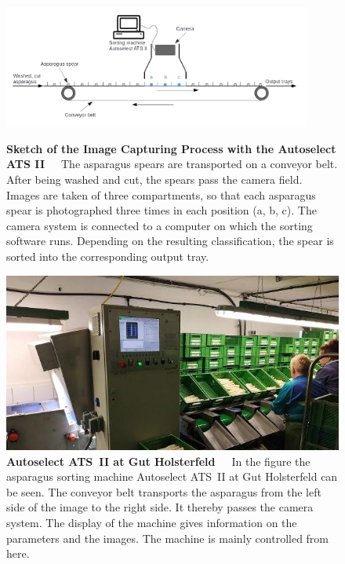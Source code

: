 \begin{figure}[!htb]
	\centering
	\includegraphics[width=0.9\textwidth]{Figures/chapter02/asparagusconveyerbelt_new.png}
	\decoRule
	\caption[Sketch of the Image Capturing Process with the Autoselect ATS II]{\textbf{Sketch of the Image Capturing Process with the Autoselect ATS II}~~~The asparagus spears are transported on a conveyor belt. After being washed and cut, the spears pass the camera field. Images are taken of three compartments, so that each asparagus spear is photographed three times in each position (a, b, c). The camera system is connected to a computer on which the sorting software runs. Depending on the resulting classification, the spear is sorted into the corresponding output tray.}
	\label{fig:SortingMachineSketch}
	\vspace{15pt}
	\centering
	\includegraphics[scale=0.6]{Figures/chapter02/sortingmachine_front.png}
	\decoRule
	\caption[The Autoselect ATS II at Gut Holsterfeld]{\textbf{Autoselect ATS~II at Gut Holsterfeld}~~~In the figure the asparagus sorting machine Autoselect ATS~II at Gut Holsterfeld can be seen. The conveyor belt transports the asparagus from the left side of the image to the right side. It thereby passes the camera system. The display of the machine gives information on the parameters and the images. The machine is mainly controlled from here.}
	\label{fig:SortingMachine}
\end{figure}

